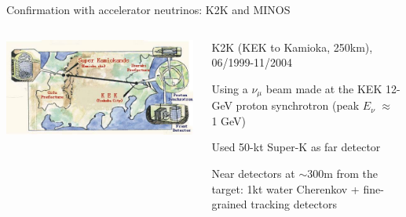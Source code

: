 \begin{frame}[t]{Confirmation with accelerator neutrinos: K2K and MINOS}

\begin{columns}
  \begin{column}{0.40\textwidth}
    \includegraphics[width=0.99\textwidth]{./images/3nu/accelerator/k2k_layout.png}
  \end{column}
  \begin{column}{0.60\textwidth}
    \begin{itemize}
    {\scriptsize
      \item K2K (KEK to Kamioka, 250km), 06/1999-11/2004\\
      \item Using a $\nu_{\mu}$ beam made at the KEK 12-GeV proton synchrotron (peak $E_{\nu}$ $\approx$ 1 GeV)
      \item Used 50-kt Super-K as far detector
      \item Near detectors at $\sim$300m from the target: 1kt water Cherenkov + fine-grained tracking detectors\\
    }
    \end{itemize}
  \end{column}
\end{columns}


\end{frame}
